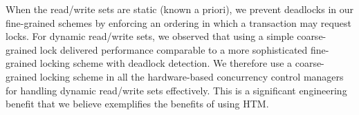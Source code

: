 When the read/write sets are static (known a priori), we prevent deadlocks in our
fine-grained schemes by enforcing an ordering in which a transaction may request 
locks. For dynamic read/write sets, we observed that using a simple coarse-grained 
lock delivered performance comparable to a more sophisticated fine-grained 
locking scheme with deadlock detection. We therefore use a coarse-grained locking
scheme in all the hardware-based concurrency control managers for handling
dynamic read/write sets effectively. This is a significant engineering benefit that 
we believe exemplifies the benefits of using HTM.  \\
